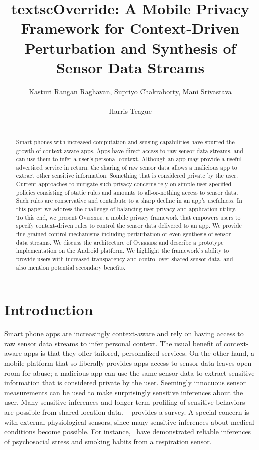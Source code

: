 \documentclass[10pt]{sensys-proc}
\author{
\alignauthor Kasturi Rangan Raghavan, Supriyo Chakraborty, Mani Srivastava\\
	\affaddr{University of California, Los Angeles}\\
	\email{\{kasturir,supriyo,mani\}@ucla.edu}
\alignauthor Harris Teague\\
	\affaddr{Qualcomm Inc.}\\
	\email{hteague@qualcomm.com}
}
\title{textsc{Override}: A Mobile Privacy Framework for Context-Driven
Perturbation and Synthesis of Sensor Data Streams}
\begin{document}
\maketitle

\begin{abstract}
Smart phones with increased computation and sensing capabilities have spurred the growth of context-aware apps. Apps have direct access to raw sensor data streams, and can use them to infer a user's personal context. Although an app may provide a useful advertised service in return, the sharing of raw sensor data allows a malicious app to extract other sensitive information. Something that is considered private by the user. Current approaches to mitigate such privacy concerns rely on simple user-specified policies consisting of static rules and amounts to all-or-nothing access to sensor data. Such rules are conservative and contribute to a sharp decline in an app's usefulness. In this paper we address the challenge of balancing user privacy and application utility. To this end, we present \textsc{Override}: a mobile privacy framework that empowers users to specify context-driven rules to control the sensor data delivered to an app. We provide fine-grained control mechanisms including perturbation or even synthesis of sensor data streams. We discuss the architecture of \textsc{Override} and describe a prototype implementation on the Android platform. We highlight the framework's ability to provide users with increased transparency and control over shared sensor data, and also mention potential secondary benefits.
\end{abstract}

\section{Introduction}
\label{sec:intro}
Smart phone apps are increasingly context-aware and rely on having access to raw sensor data streams to infer personal context. The usual benefit of context-aware apps is that they offer tailored, personalized services. On the other hand, a mobile platform that so liberally provides apps access to sensor data leaves open room for abuse; a malicious app can use the same sensor data to extract sensitive information that is considered private by the user. Seemingly innocuous sensor measurements can be used to make surprisingly sensitive inferences about the user. Many sensitive inferences and longer-term profiling of sensitive behaviors are possible from shared location data. ~\cite{krumm:survey} provides a survey. A special concern is with external physiological sensors, since many sensitive inferences about medical conditions become possible. For instance,~\cite{plarre:psychological,rahman:mConverse,Ertin:AutoSense} have demonstrated reliable inferences of psychosocial stress and smoking habits from a respiration sensor.
\end{document}
